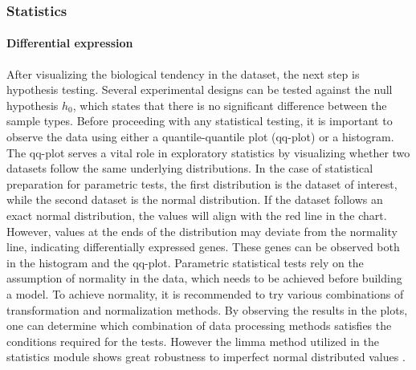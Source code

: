 \documentclass[
  11pt,
]{article}
\begin{document}
\hypertarget{statistics}{%
\subsubsection{Statistics}\label{statistics}}

\hypertarget{differential-expression}{%
\paragraph{Differential expression}\label{differential-expression}}

After visualizing the biological tendency in the dataset, the next step is hypothesis testing. Several experimental designs can be tested against the null hypothesis \(h_0\), which states that there is no significant difference between the sample types. Before proceeding with any statistical testing, it is important to observe the data using either a quantile-quantile plot (qq-plot) or a histogram. The qq-plot serves a vital role in exploratory statistics by visualizing whether two datasets follow the same underlying distributions. In the case of statistical preparation for parametric tests, the first distribution is the dataset of interest, while the second dataset is the normal distribution. If the dataset follows an exact normal distribution, the values will align with the red line in the chart. However, values at the ends of the distribution may deviate from the normality line, indicating differentially expressed genes. These genes can be observed both in the histogram and the qq-plot.
Parametric statistical tests rely on the assumption of normality in the data, which needs to be achieved before building a model. To achieve normality, it is recommended to try various combinations of transformation and normalization methods. By observing the results in the plots, one can determine which combination of data processing methods satisfies the conditions required for the tests. However the limma method utilized in the statistics module shows great robustness to imperfect normal distributed values \citep{Ritchie2015}.
\end{document}

